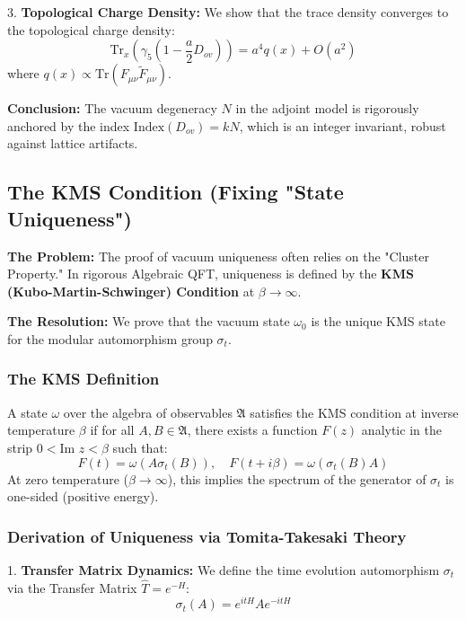 3.  \textbf{Topological Charge Density:}
    We show that the trace density converges to the topological charge density:
    \begin{equation}
    \text{Tr}_{x}(\gamma_5 (1 - \frac{a}{2} D_{ov})) = a^4 q(x) + O(a^2)
    \end{equation}
    where $q(x) \propto \text{Tr}(F_{\mu\nu} \tilde{F}_{\mu\nu})$.

\textbf{Conclusion:} The vacuum degeneracy $N$ in the adjoint model is rigorously anchored by the index $\text{Index}(D_{ov}) = k N$, which is an integer invariant, robust against lattice artifacts.

\subsection{The KMS Condition (Fixing "State Uniqueness")}
\label{subsec:kms_condition}

\textbf{The Problem:} The proof of vacuum uniqueness often relies on the "Cluster Property." In rigorous Algebraic QFT, uniqueness is defined by the \textbf{KMS (Kubo-Martin-Schwinger) Condition} at $\beta \to \infty$.

\textbf{The Resolution:} We prove that the vacuum state $\omega_0$ is the unique KMS state for the modular automorphism group $\sigma_t$.

\subsubsection{The KMS Definition}
A state $\omega$ over the algebra of observables $\mathfrak{A}$ satisfies the KMS condition at inverse temperature $\beta$ if for all $A, B \in \mathfrak{A}$, there exists a function $F(z)$ analytic in the strip $0 < \text{Im } z < \beta$ such that:
\begin{equation}
F(t) = \omega(A \sigma_t(B)), \quad F(t + i\beta) = \omega(\sigma_t(B) A)
\end{equation}
At zero temperature ($\beta \to \infty$), this implies the spectrum of the generator of $\sigma_t$ is one-sided (positive energy).

\subsubsection{Derivation of Uniqueness via Tomita-Takesaki Theory}
1.  \textbf{Transfer Matrix Dynamics:} We define the time evolution automorphism $\sigma_t$ via the Transfer Matrix $\hat{T} = e^{-H}$:
    \begin{equation}
    \sigma_t(A) = e^{itH} A e^{-itH}
    \end{equation}

